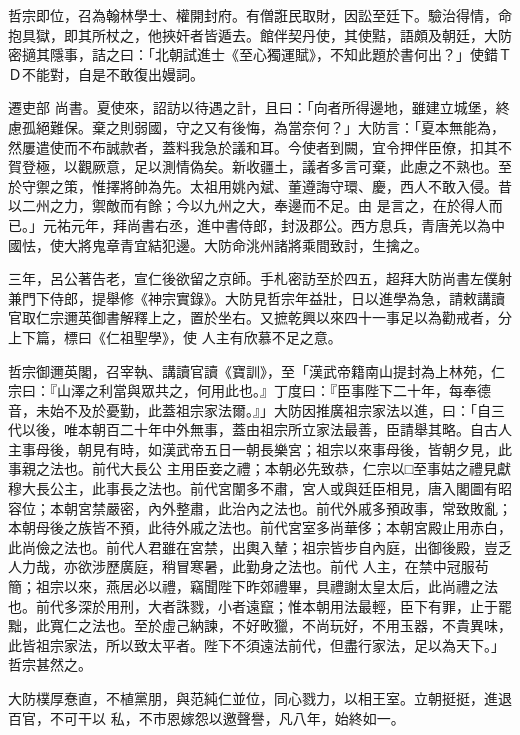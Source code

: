 \begin{pinyinscope}
 哲宗即位，召為翰林學士、權開封府。有僧誑民取財，因訟至廷下。驗治得情，命抱具獄，即其所杖之，他挾奸者皆遁去。館伴契丹使，其使黠，語頗及朝廷，大防密擿其隱事，詰之曰：「北朝試進士《至心獨運賦》，不知此題於書何出？」使錯ＴＤ不能對，自是不敢復出嫚詞。



 遷吏部
 尚書。夏使來，詔訪以待遇之計，且曰：「向者所得邊地，雖建立城堡，終慮孤絕難保。棄之則弱國，守之又有後悔，為當奈何？」大防言：「夏本無能為，然屢遣使而不布誠款者，蓋料我急於議和耳。今使者到闕，宜令押伴臣僚，扣其不賀登極，以觀厥意，足以測情偽矣。新收疆土，議者多言可棄，此慮之不熟也。至於守禦之策，惟擇將帥為先。太祖用姚內斌、董遵誨守環、慶，西人不敢入侵。昔以二州之力，禦敵而有餘；今以九州之大，奉邊而不足。由
 是言之，在於得人而已。」元祐元年，拜尚書右丞，進中書侍郎，封汲郡公。西方息兵，青唐羌以為中國怯，使大將鬼章青宜結犯邊。大防命洮州諸將乘間致討，生擒之。



 三年，呂公著告老，宣仁後欲留之京師。手札密訪至於四五，超拜大防尚書左僕射兼門下侍郎，提舉修《神宗實錄》。大防見哲宗年益壯，日以進學為急，請敕講讀官取仁宗邇英御書解釋上之，置於坐右。又摭乾興以來四十一事足以為勸戒者，分上下篇，標曰《仁祖聖學》，使
 人主有欣慕不足之意。



 哲宗御邇英閣，召宰執、講讀官讀《寶訓》，至「漢武帝籍南山提封為上林苑，仁宗曰：『山澤之利當與眾共之，何用此也。』丁度曰：『臣事陛下二十年，每奉德音，未始不及於憂勤，此蓋祖宗家法爾。』」大防因推廣祖宗家法以進，曰：「自三代以後，唯本朝百二十年中外無事，蓋由祖宗所立家法最善，臣請舉其略。自古人主事母後，朝見有時，如漢武帝五日一朝長樂宮；祖宗以來事母後，皆朝夕見，此事親之法也。前代大長公
 主用臣妾之禮；本朝必先致恭，仁宗以□至事姑之禮見獻穆大長公主，此事長之法也。前代宮闈多不肅，宮人或與廷臣相見，唐入閣圖有昭容位；本朝宮禁嚴密，內外整肅，此治內之法也。前代外戚多預政事，常致敗亂；本朝母後之族皆不預，此待外戚之法也。前代宮室多尚華侈；本朝宮殿止用赤白，此尚儉之法也。前代人君雖在宮禁，出輿入輦；祖宗皆步自內庭，出御後殿，豈乏人力哉，亦欲涉歷廣庭，稍冒寒暑，此勤身之法也。前代
 人主，在禁中冠服茍簡；祖宗以來，燕居必以禮，竊聞陛下昨郊禮畢，具禮謝太皇太后，此尚禮之法也。前代多深於用刑，大者誅戮，小者遠竄；惟本朝用法最輕，臣下有罪，止于罷黜，此寬仁之法也。至於虛己納諫，不好畋獵，不尚玩好，不用玉器，不貴異味，此皆祖宗家法，所以致太平者。陛下不須遠法前代，但盡行家法，足以為天下。」哲宗甚然之。



 大防樸厚惷直，不植黨朋，與范純仁並位，同心戮力，以相王室。立朝挺挺，進退百官，不可干以
 私，不市恩嫁怨以邀聲譽，凡八年，始終如一。




\end{pinyinscope}
